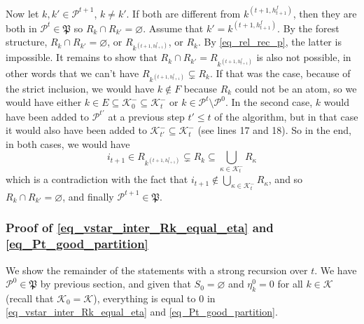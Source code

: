 \documentclass[
  11pt,
  a4paper,
]{article}
\theoremstyle{plain}
\theoremstyle{definition}
\theoremstyle{plain}
\theoremstyle{definition}
\theoremstyle{plain}
\theoremstyle{remark}
\begin{document}
Now let \(k,k'\in\mathcal{P}^{t+1}\), \(k\neq k'\). If both are
different from \(k^{(t+1,h^f_{t+1})}\), then they are both in
\(\mathcal{P}^t\in\mathfrak P\) so \(R_k\cap R_{k'}=\varnothing\).
Assume that \(k'=k^{(t+1,h^f_{t+1})}\). By the forest structure,
\(R_k\cap R_{k'}=\varnothing\), or \(R_{k^{(t+1,h^f_{t+1})}}\), or
\(R_k\). By \eqref{eq_rel_rec_p}, the latter is impossible. It remains
to show that \(R_k\cap R_{k'}=R_{  k^{(t+1,h^f_{t+1})}}\) is also not
possible, in other words that we can't have
\(R_{  k^{(t+1,h^f_{t+1})}} \subsetneq  R_{k}\). If that was the case,
because of the strict inclusion, we would have \(k\not\in F\) because
\(R_{k}\) could not be an atom, so we would have either
\(k\in E\subseteq \mathcal{K}^-_0 \subseteq \mathcal{K}^-_t\) or
\(k\in\mathcal{P}^t\setminus\mathcal{P}^0\). In the second case, \(k\)
would have been added to \(\mathcal{P}^{t'}\) at a previous step
\(t'\leq t\) of the algorithm, but in that case it would also have been
added to \(\mathcal{K}_{t'}^-\subseteq \mathcal{K}_{t}^-\) (see lines 17
and 18). So in the end, in both cases, we would have \begin{equation*}
i_{t+1}\in R_{  k^{(t+1,h^f_{t+1})}}  \subsetneq  R_{k} \subseteq \bigcup_{\kappa\in\mathcal{K}^-_{t}}R_{\kappa}
\end{equation*} which is a contradiction with the fact that
\(i_{t+1}\not\in\bigcup_{\kappa \in \mathcal{K}^-_t} R_{\kappa}\), and
so \(R_k\cap R_{k'}=\varnothing\), and finally
\(\mathcal{P}^{t+1}\in\mathfrak P\).

\subsubsection{\texorpdfstring{Proof of
\eqref{eq_vstar_inter_Rk_equal_eta} and
\eqref{eq_Pt_good_partition}}{Proof of  and }}\label{proof-of-and}

We show the remainder of the statements with a strong recursion over
\(t\). We have \(\mathcal{P}^0\in\mathfrak P\) by previous section, and
given that \(S_0=\varnothing\) and \(\eta^0_k=0\) for all
\(k\in\mathcal{K}\) (recall that \(\mathcal{K}_0=\mathcal{K}\)),
everything is equal to 0 in \eqref{eq_vstar_inter_Rk_equal_eta} and
\eqref{eq_Pt_good_partition}.
\end{document}
